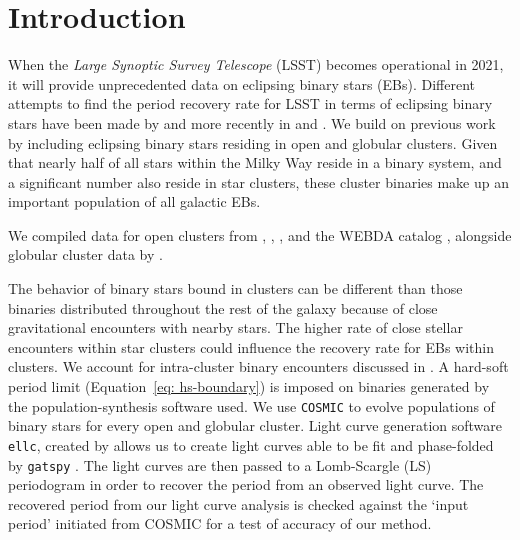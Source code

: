 \documentclass[twocolumn]{aastex63}
\begin{document}


\section{Introduction} \label{sec:Intro}
When the \textit{Large Synoptic Survey Telescope} (LSST) becomes operational in 2021, it will provide unprecedented data on eclipsing binary stars (EBs). Different attempts to find the period recovery rate for LSST in terms of eclipsing binary stars have been made by \citet{2011AJ....142...52P} and more recently in \citet{2017PASP..129f5003W} and \citet{2019AAS...23336317P}. We build on previous work by including eclipsing binary stars residing in open and globular clusters. Given that nearly half of all stars within the Milky Way reside in a binary system, and a significant number also reside in star clusters, these cluster binaries make up an important population of all galactic EBs. 

We compiled data for open clusters from \citet{2008A&A...477..165P}, \citet{2004A&A...414..163S}, \citet{2006AJ....131.1559V}, and the WEBDA catalog \citep{1995MNRAS.275..828M}, alongside globular cluster data by \citet{1996AJ....112.1487H}. 

The behavior of binary stars bound in clusters can be different than those binaries distributed throughout the rest of the galaxy because of close gravitational encounters with nearby stars. The higher rate of close stellar encounters within star clusters could influence the recovery rate for EBs within clusters. We account for intra-cluster binary encounters discussed in \citet{2015ApJ...808L..25G}. A hard-soft period limit (Equation~\ref{eq: hs-boundary}) is imposed on binaries generated by the population-synthesis software used. We use \texttt{COSMIC} \citep{2018PhDT........74B} to evolve populations of binary stars for every open and globular cluster. Light curve generation software \texttt{ellc}, created by \citet{2016ascl.soft03016M} allows us to create light curves able to be fit and phase-folded by \texttt{gatspy} \citep{2015ApJ...812...18V}. The light curves are then passed to a Lomb-Scargle (LS) periodogram in order to recover the period from an observed light curve. The recovered period from our light curve analysis is checked against the ‘input period’ initiated from COSMIC for a test of accuracy of our method.
\end{document}
